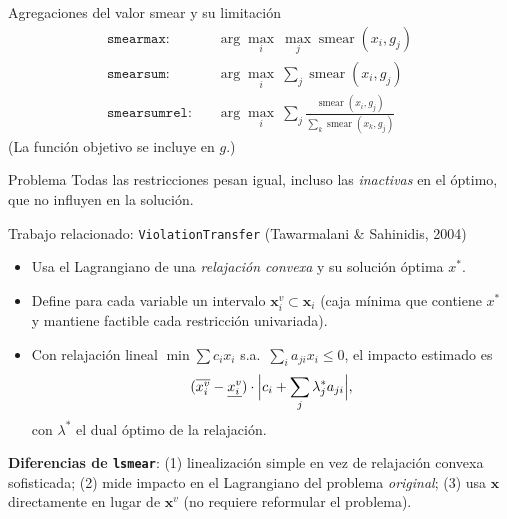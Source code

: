 \documentclass[10pt,aspectratio=169]{beamer}
\newcommand{\intv}[1]{\mathbf{#1}}
\newcommand{\smear}{\operatorname{smear}}
\newcommand{\ls}{\texttt{lsmear}}
\begin{document}
\begin{frame}{Agregaciones del valor smear y su limitación}
\begin{align*}
\texttt{smearmax}:&\quad \arg\max_i\ \max_{j} \smear(x_i,g_j)\\
\texttt{smearsum}:&\quad \arg\max_i\ \sum_{j} \smear(x_i,g_j)\\
\texttt{smearsumrel}:&\quad \arg\max_i\ \sum_{j} \frac{\smear(x_i,g_j)}{\sum_k \smear(x_k,g_j)}
\end{align*}
(La función objetivo se incluye en $g$.)

\vspace{1ex}
\begin{alertblock}{Problema}
Todas las restricciones pesan igual, incluso las \emph{inactivas} en el óptimo, que no influyen en la solución.
\end{alertblock}
\end{frame}

\begin{frame}{Trabajo relacionado: \texttt{ViolationTransfer} (Tawarmalani \& Sahinidis, 2004)}
\begin{itemize}
  \item Usa el Lagrangiano de una \emph{relajación convexa} y su solución óptima $x^*$.
  \item Define para cada variable un intervalo $\intv{x}^v_i\subset\intv{x}_i$ (caja mínima que contiene $x^*$ y mantiene factible cada restricción univariada).
  \item Con relajación lineal $\min \sum c_i x_i$ s.a.\ $\sum_i a_{ji}x_i\le 0$, el impacto estimado es
  \[
    (\overline{x^v_i}-\underline{x^v_i})\cdot\Bigl|c_i+\sum_{j}\lambda^*_j a_{ji}\Bigr|,
  \]
  con $\lambda^*$ el dual óptimo de la relajación.
\end{itemize}
\vspace{1ex}
\textbf{Diferencias de \ls{}}: (1) linealización simple en vez de relajación convexa sofisticada; (2) mide impacto en el Lagrangiano del problema \emph{original}; (3) usa $\intv{x}$ directamente en lugar de $\intv{x}^v$ (no requiere reformular el problema).
\end{frame}
\end{document}
